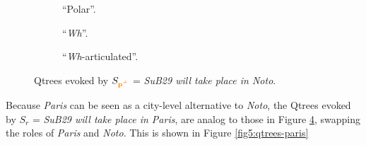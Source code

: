 \begin{figure}[H]
	\centering
	\begin{subfigure}[b]{.2\linewidth}
		\centering
		\caption[]{``Polar''.}\label{fig5:qtree-noto-polar-r}
	\end{subfigure}\hfill
	\begin{subfigure}[b]{.37\linewidth}
		\centering
		\caption[]{``\textit{Wh}''.}\label{fig5:qtree-noto-wh-r}
	\end{subfigure}\hfill
	\begin{subfigure}[b]{.37\linewidth}
		\centering
		\caption[]{``\textit{Wh}-articulated''.}\label{fig5:qtree-noto-tiered-rr}
	\end{subfigure}
	\caption[]{Qtrees evoked by $S_{\textbf{\textcolor{orange}{p$^+$}}}$ = \textit{SuB29 will take place in Noto}.}\label{fig5:qtrees-noto-r}
\end{figure}

Because \textit{Paris} can be seen as a city-level alternative to \textit{Noto}, the Qtrees evoked by $S_{r}$ = \textit{SuB29 will take place in Paris}, are analog to those in Figure \ref{fig5:qtrees-noto-r}, swapping the roles of \textit{Paris} and \textit{Noto}. This is shown in Figure \ref{fig5:qtrees-paris}

